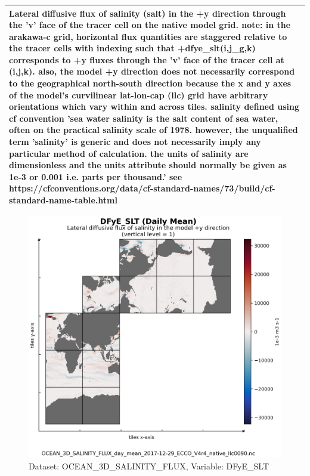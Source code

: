 \begin{longtable}{|m{}|m{}|m{}|m{}|}
\multicolumn{4}{|p{1\textwidth}|}{\footnotesize{{Lateral diffusive flux of salinity (salt) in the +y direction through the 'v' face of the tracer cell on the native model grid. note: in the arakawa-c grid, horizontal flux quantities are staggered relative to the tracer cells with indexing such that +dfye\_slt(i,j\_g,k) corresponds to +y fluxes through the 'v' face of the tracer cell at (i,j,k). also, the model +y direction does not necessarily correspond to the geographical north-south direction because the x and y axes of the model's curvilinear lat-lon-cap (llc) grid have arbitrary orientations which vary within and across tiles. salinity defined using cf convention 'sea water salinity is the salt content of sea water, often on the practical salinity scale of 1978. however, the unqualified term 'salinity' is generic and does not necessarily imply any particular method of calculation. the units of salinity are dimensionless and the units attribute should normally be given as 1e-3 or 0.001 i.e. parts per thousand.' see https://cfconventions.org/data/cf-standard-names/73/build/cf-standard-name-table.html}}} \\ \hline
\end{longtable}

\begin{figure}[H]
\centering
\includegraphics[scale=0.55]{../images/plots/native_plots/Ocean_Three-Dimensional_Salinity_Fluxes/DFyE_SLT.png}
\caption{Dataset: OCEAN\_3D\_SALINITY\_FLUX, Variable: DFyE\_SLT}
\label{tab:table-OCEAN_3D_SALINITY_FLUX_DFyE_SLT-Plot}
\end{figure}
\newpage
\pagebreak

